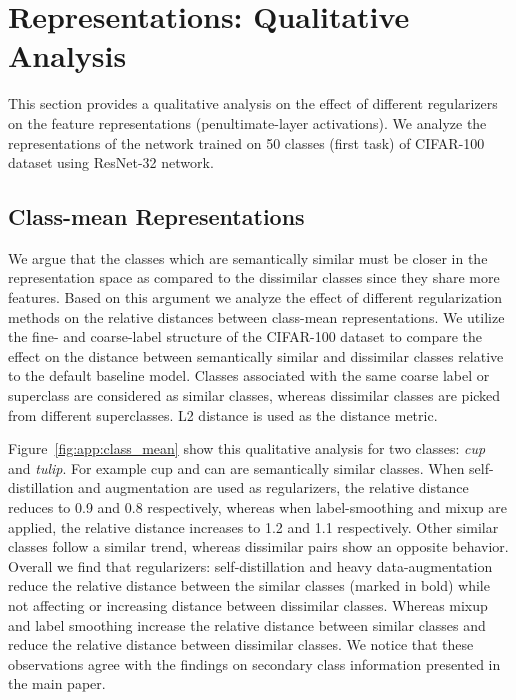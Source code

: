 \documentclass[final]{cvpr}
\begin{document}
 


\section{Representations: Qualitative Analysis}

This section provides a qualitative analysis on the effect of different regularizers on the feature representations (penultimate-layer activations). We analyze the representations of the network trained on 50 classes (first task) of CIFAR-100 dataset using ResNet-32 network. 



\subsection{Class-mean Representations}\label{sec:app:class_mean}

We argue that the classes which are semantically similar must be closer in the representation space as compared to the dissimilar classes since they share more features.
Based on this argument we analyze the effect of different regularization methods on the relative distances between class-mean representations. 
We utilize the fine- and coarse-label structure of the CIFAR-100 dataset to compare the effect on the distance between semantically similar and dissimilar classes relative to the default baseline model. Classes associated with the same coarse label or superclass are considered as similar classes, whereas dissimilar classes are picked from different superclasses. L2 distance is used as the distance metric.


Figure~\ref{fig:app:class_mean} show this qualitative analysis for two classes: \textit{cup} and \textit{tulip}. For example cup and can are semantically similar classes. When self-distillation and augmentation are used as regularizers, the relative distance reduces to 0.9 and 0.8 respectively, whereas when label-smoothing and mixup are applied, the relative distance increases to 1.2 and 1.1 respectively. Other similar classes follow a similar trend, whereas dissimilar pairs show an opposite behavior. 
Overall we find that regularizers: self-distillation and heavy data-augmentation reduce the relative distance between the similar classes (marked in bold) while not affecting or increasing distance between dissimilar classes. Whereas mixup and label smoothing increase the relative distance between similar classes and reduce the relative distance between dissimilar classes. We notice that these observations agree with the findings on secondary class information presented in the main paper. 
\end{document}

